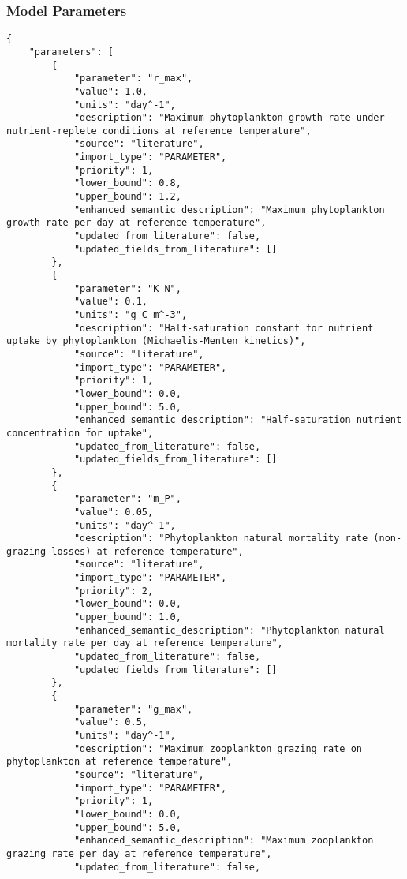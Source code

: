 \subsubsection{Model Parameters}
\begin{lstlisting}
{
    "parameters": [
        {
            "parameter": "r_max",
            "value": 1.0,
            "units": "day^-1",
            "description": "Maximum phytoplankton growth rate under nutrient-replete conditions at reference temperature",
            "source": "literature",
            "import_type": "PARAMETER",
            "priority": 1,
            "lower_bound": 0.8,
            "upper_bound": 1.2,
            "enhanced_semantic_description": "Maximum phytoplankton growth rate per day at reference temperature",
            "updated_from_literature": false,
            "updated_fields_from_literature": []
        },
        {
            "parameter": "K_N",
            "value": 0.1,
            "units": "g C m^-3",
            "description": "Half-saturation constant for nutrient uptake by phytoplankton (Michaelis-Menten kinetics)",
            "source": "literature",
            "import_type": "PARAMETER",
            "priority": 1,
            "lower_bound": 0.0,
            "upper_bound": 5.0,
            "enhanced_semantic_description": "Half-saturation nutrient concentration for uptake",
            "updated_from_literature": false,
            "updated_fields_from_literature": []
        },
        {
            "parameter": "m_P",
            "value": 0.05,
            "units": "day^-1",
            "description": "Phytoplankton natural mortality rate (non-grazing losses) at reference temperature",
            "source": "literature",
            "import_type": "PARAMETER",
            "priority": 2,
            "lower_bound": 0.0,
            "upper_bound": 1.0,
            "enhanced_semantic_description": "Phytoplankton natural mortality rate per day at reference temperature",
            "updated_from_literature": false,
            "updated_fields_from_literature": []
        },
        {
            "parameter": "g_max",
            "value": 0.5,
            "units": "day^-1",
            "description": "Maximum zooplankton grazing rate on phytoplankton at reference temperature",
            "source": "literature",
            "import_type": "PARAMETER",
            "priority": 1,
            "lower_bound": 0.0,
            "upper_bound": 5.0,
            "enhanced_semantic_description": "Maximum zooplankton grazing rate per day at reference temperature",
            "updated_from_literature": false,

\end{lstlisting}
